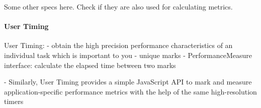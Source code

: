 

























Some other specs here.
Check if they are also used for calculating metrics.


\paragraph{User Timing}

User Timing:
-  obtain the high precision performance characteristics of an individual task which is important to you
- unique marks
- PerformanceMeasure interface: calculate the elapsed time between two marks



- Similarly, User Timing provides a simple JavaScript API to mark and measure application-specific performance metrics with the help of the same high-resolution timers


